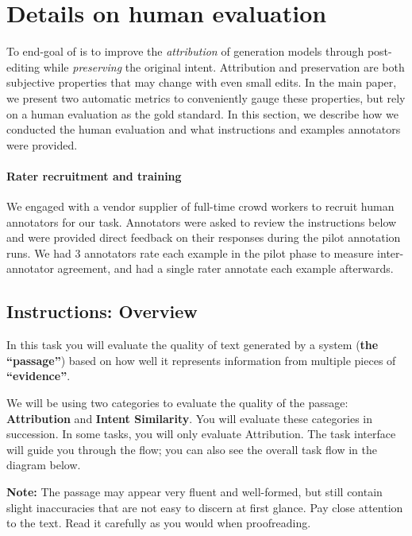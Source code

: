 \section{Details on human evaluation}
\label{sec:app-human-eval}

To end-goal of \approach{} is to improve the \textit{attribution} of generation models through post-editing while \textit{preserving} the original intent.
Attribution and preservation are both subjective properties that may change with even small edits.
In the main paper, we present two automatic metrics to conveniently gauge these properties, but rely on a human evaluation as the gold standard.
In this section, we describe how we conducted the human evaluation and what instructions and examples annotators were provided.

\paragraph{Rater recruitment and training}
We engaged with a vendor supplier of full-time crowd workers to recruit human annotators for our task.
Annotators were asked to review the instructions below and were provided direct feedback on their responses during the pilot annotation runs.
We had 3 annotators rate each example in the pilot phase to measure inter-annotator agreement, and had a single rater annotate each example afterwards.

\subsection{Instructions: Overview}

In this task you will evaluate the quality of text generated by a system (\textbf{the ``passage''}) based on how well it represents information from multiple pieces of \textbf{``evidence''}.

We will be using two categories to evaluate the quality of the passage: \textbf{Attribution} and \textbf{Intent Similarity}. You will evaluate these categories in succession. In some tasks, you will only evaluate Attribution. The task interface will guide you through the flow; you can also see the overall task flow in the diagram below. 

\textbf{Note:} The passage may appear very fluent and well-formed, but still contain slight inaccuracies that are not easy to discern at first glance. Pay close attention to the text. Read it carefully as you would when proofreading.

